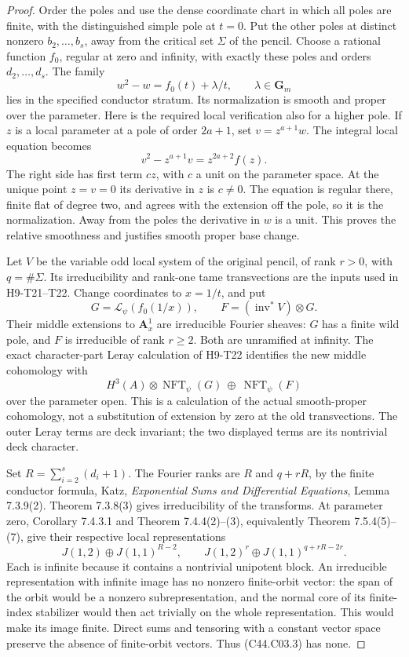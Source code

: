 \begin{proof}
Order the poles and use the dense coordinate chart in which all poles
are finite, with the distinguished simple pole at $t=0$. Put the other
poles at distinct nonzero $b_2,\ldots,b_s$, away from the critical set
$\Sigma$ of the pencil. Choose a rational function $f_0$, regular at zero
and infinity, with exactly these poles and orders $d_2,\ldots,d_s$.
The family
\[
                  w^2-w=f_0(t)+\lambda/t,
                  \qquad \lambda\in\mathbf G_m
 \tag{C44.C03.2}
\]
lies in the specified conductor stratum. Its normalization is smooth
and proper over the parameter. Here is the required local verification
also for a higher pole. If $z$ is a local parameter at a pole of order
$2a+1$, set $v=z^{a+1}w$. The integral local equation becomes
\[
 v^2-z^{a+1}v=z^{2a+2}f(z).
\]
The right side has first term $c z$, with $c$ a unit on the parameter
space. At the unique point $z=v=0$ its derivative in $z$ is $c\ne0$.
The equation is regular there, finite flat of degree two, and agrees
with the extension off the pole, so it is the normalization. Away from
the poles the derivative in $w$ is a unit. This proves the relative
smoothness and justifies smooth proper base change.

Let $V$ be the variable odd local system of the original pencil,
of rank $r>0$, with $q=\#\Sigma$. Its irreducibility and rank-one tame
transvections are the inputs used in H9-T21--T22. Change coordinates
to $x=1/t$, and put
\[
 G=\mathcal L_\psi(f_0(1/x)),\qquad
 F=(\operatorname{inv}^*V)\otimes G.
\]
Their middle extensions to $\mathbf A^1_x$ are irreducible Fourier
sheaves: $G$ has a finite wild pole, and $F$ is irreducible of rank
$r\ge2$. Both are unramified at infinity. The exact character-part
Leray calculation of H9-T22 identifies the new middle cohomology
with
\[
 H^3(A)\otimes\operatorname{NFT}_\psi(G)
       \ \oplus\ \operatorname{NFT}_\psi(F)
 \tag{C44.C03.3}
\]
over the parameter open. This is a calculation of the actual
smooth-proper cohomology, not a substitution of extension by zero at
the old transvections. The outer Leray terms are deck invariant; the
two displayed terms are its nontrivial deck character.

Set $R=\sum_{i=2}^s(d_i+1)$. The Fourier ranks are $R$ and $q+rR$,
by the finite conductor formula, Katz, \emph{Exponential Sums and
Differential Equations}, Lemma 7.3.9(2). Theorem 7.3.8(3) gives
irreducibility of the transforms. At parameter zero, Corollary
7.4.3.1 and Theorem 7.4.4(2)--(3), equivalently Theorem 7.5.4(5)--(7),
give their respective local representations
\[
 J(1,2)\oplus J(1,1)^{R-2},\qquad
 J(1,2)^{r}\oplus J(1,1)^{q+rR-2r}.
 \tag{C44.C03.4}
\]
Each is infinite because it contains a nontrivial unipotent block.
An irreducible representation with infinite image has no nonzero
finite-orbit vector: the span of the orbit would be a nonzero
subrepresentation, and the normal core of its finite-index stabilizer
would then act trivially on the whole representation. This would make
its image finite. Direct sums and tensoring with a constant vector
space preserve the absence of finite-orbit vectors. Thus (C44.C03.3)
has none.


\end{proof}
